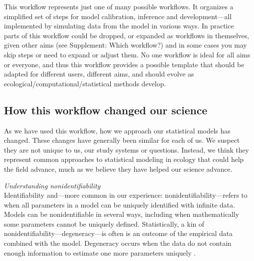\documentclass[11pt]{article}
\begin{document}
{This workflow represents just one of many possible workflows. It organizes a simplified set of steps for model calibration, inference and development---all implemented by simulating data from the model in various ways. In practice parts of this workflow could be dropped, or expanded as workflows in themselves, given other aims (see Supplement: Which workflow?) and in some cases you may skip steps or need to expand or adjust them. No one workflow is ideal for all aims or everyone, and thus this workflow provides a possible template that should be adapted for different users, different aims, and should evolve as ecological/computational/statistical methods develop. 

\subsection*{How this workflow changed our science} %

As we have used this workflow, how we approach our statistical models has changed. These changes have generally been similar for each of us. We suspect they are not unique to us, our study systems or questions. Instead, we think they represent common approaches to statistical modeling in ecology that could help the field advance, much as we believe they have helped our science advance. 

 \emph{Understanding nonidentifiability} \\
Identifiability and---more common in our experience: nonidentifiability---refers to when all parameters in a model can be uniquely identified with infinite data. Models can be nonidentifiable in several ways, including when mathematically some parameters cannot be uniquely defined. Statistically, a kin of nonidentifiability---degeneracy---is often is an outcome of the empirical data combined with the model. Degeneracy occurs when the data do not contain enough information to estimate one more parameters uniquely \citep{gelmanhill}. 

}
\end{document}

